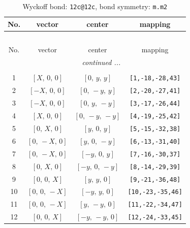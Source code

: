 \documentclass[fleqn,8pt]{jsarticle}
\begin{document}
\begin{longtable}{cccc}
\caption{Wyckoff bond: {\tt 12c@12c}, bond symmetry: {\tt m.m2}}
 \\
 \hline \hline
No. & vector & center & mapping \\ \hline \endfirsthead

\multicolumn{3}{l}{\tablename\ \thetable{}} \\
 \hline \hline
No. & vector & center & mapping \\ \hline \endhead

 \hline \hline
\multicolumn{3}{r}{\footnotesize\it continued ...} \\ \endfoot

 \hline \hline
\multicolumn{3}{r}{} \\ \endlastfoot

1 & $\left[ X,\, 0,\, 0 \right]$ & $\left[ 0,\, y,\, y \right]$ & {\tt [1,-18,-28,43]} \\ \hline
2 & $\left[ - X,\, 0,\, 0 \right]$ & $\left[ 0,\, - y,\, y \right]$ & {\tt [2,-20,-27,41]} \\ \hline
3 & $\left[ - X,\, 0,\, 0 \right]$ & $\left[ 0,\, y,\, - y \right]$ & {\tt [3,-17,-26,44]} \\ \hline
4 & $\left[ X,\, 0,\, 0 \right]$ & $\left[ 0,\, - y,\, - y \right]$ & {\tt [4,-19,-25,42]} \\ \hline
5 & $\left[ 0,\, X,\, 0 \right]$ & $\left[ y,\, 0,\, y \right]$ & {\tt [5,-15,-32,38]} \\ \hline
6 & $\left[ 0,\, - X,\, 0 \right]$ & $\left[ y,\, 0,\, - y \right]$ & {\tt [6,-13,-31,40]} \\ \hline
7 & $\left[ 0,\, - X,\, 0 \right]$ & $\left[ - y,\, 0,\, y \right]$ & {\tt [7,-16,-30,37]} \\ \hline
8 & $\left[ 0,\, X,\, 0 \right]$ & $\left[ - y,\, 0,\, - y \right]$ & {\tt [8,-14,-29,39]} \\ \hline
9 & $\left[ 0,\, 0,\, X \right]$ & $\left[ y,\, y,\, 0 \right]$ & {\tt [9,-21,-36,48]} \\ \hline
10 & $\left[ 0,\, 0,\, - X \right]$ & $\left[ - y,\, y,\, 0 \right]$ & {\tt [10,-23,-35,46]} \\ \hline
11 & $\left[ 0,\, 0,\, - X \right]$ & $\left[ y,\, - y,\, 0 \right]$ & {\tt [11,-22,-34,47]} \\ \hline
12 & $\left[ 0,\, 0,\, X \right]$ & $\left[ - y,\, - y,\, 0 \right]$ & {\tt [12,-24,-33,45]} \\
\end{longtable}
\renewcommand{\arraystretch}{1.2}
\end{document}

